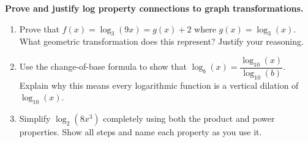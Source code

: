 \documentclass[10pt]{article}
\begin{document}
\begin{tcolorbox}[colback=white, colframe=black!40,
    title=\textbf{Tier E --- Extension},
    fonttitle=\bfseries, arc=2mm, left=3mm, right=3mm, top=2mm, bottom=2mm]

\textbf{Prove and justify log property connections to graph transformations.}

\begin{enumerate}[leftmargin=1.8em, itemsep=10pt]

\item Prove that $f(x) = \log_3(9x) = g(x) + 2$ where $g(x) = \log_3(x)$.
      What geometric transformation does this represent? Justify your reasoning.

\vspace{4pt}

\item Use the change-of-base formula to show that $\log_b(x) = \dfrac{\log_{10}(x)}{\log_{10}(b)}$.
      Explain why this means every logarithmic function is a vertical dilation of $\log_{10}(x)$.

\vspace{4pt}

\item Simplify $\log_2(8x^3)$ completely using both the product and power properties. Show
      all steps and name each property as you use it.

\vspace{4pt}

\end{enumerate}
\end{tcolorbox}
\end{document}
